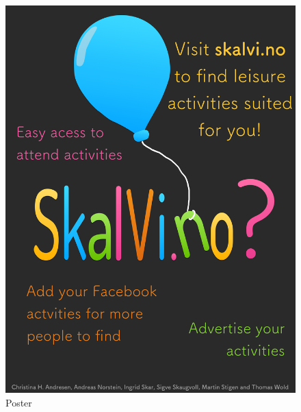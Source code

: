 \begin{figure}[ht]
\centering
    \includegraphics[width=\textwidth]{fig/finalPoster}
\caption{Poster}
\label{poster}
\end{figure}

\clearpage